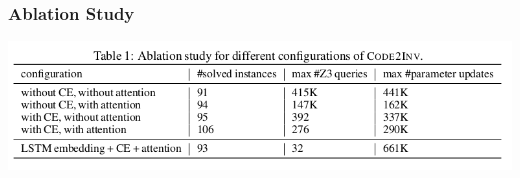 \documentclass[11pt]{beamer}
\begin{document}
\begin{frame}\frametitle{Ablation Study}
\begin{center}
\includegraphics[scale=0.4

]{ablation.png}
\end{center}
\end{frame}
\end{document}
